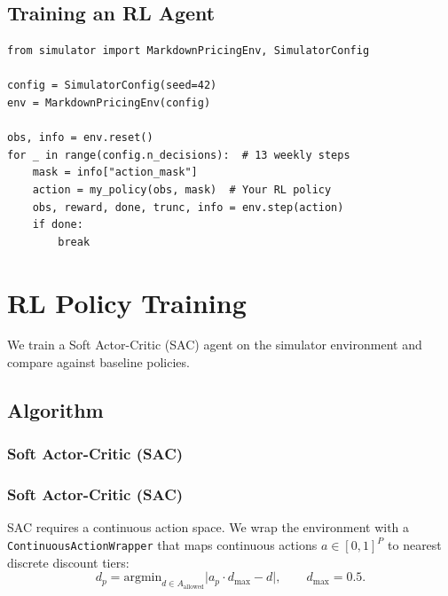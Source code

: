 \documentclass[11pt,a4paper]{article}
\begin{document}
\subsection{Training an RL Agent}

\begin{lstlisting}[caption={Using the Gymnasium environment for RL training.}]
from simulator import MarkdownPricingEnv, SimulatorConfig

config = SimulatorConfig(seed=42)
env = MarkdownPricingEnv(config)

obs, info = env.reset()
for _ in range(config.n_decisions):  # 13 weekly steps
    mask = info["action_mask"]
    action = my_policy(obs, mask)  # Your RL policy
    obs, reward, done, trunc, info = env.step(action)
    if done:
        break
\end{lstlisting}

\section{RL Policy Training}
\label{sec:rl_training}

We train a Soft Actor-Critic (SAC) agent on the simulator environment and compare against baseline policies.

\subsection{Algorithm}

\subsubsection{Soft Actor-Critic (SAC)}

\subsubsection{Soft Actor-Critic (SAC)}

SAC requires a continuous action space.
We wrap the environment with a \texttt{ContinuousActionWrapper} that maps continuous actions $a \in [0, 1]^P$ to nearest discrete discount tiers:
\begin{equation}
d_p = \text{argmin}_{d \in A_{\text{allowed}}} \bigl|a_p \cdot d_{\max} - d\bigr|, \qquad d_{\max} = 0.5.
\end{equation}
\end{document}

